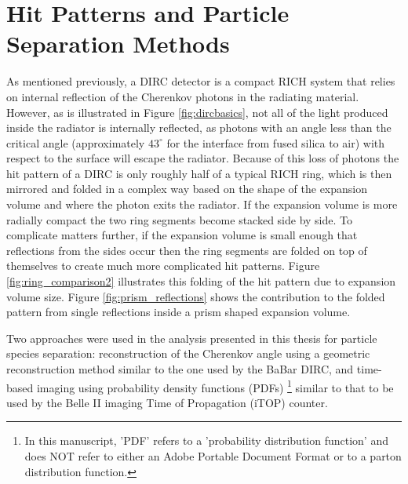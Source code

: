 \section{Hit Patterns and Particle Separation Methods}
As mentioned previously, a DIRC detector is a compact RICH system that relies on internal reflection of the Cherenkov photons in the radiating material. However, as is illustrated in Figure \ref{fig:dircbasics}, not all of the light produced inside the radiator is internally reflected, as photons with an angle less than the critical angle (approximately $43^{\circ}$ for the interface from fused silica to air) with respect to the surface will escape the radiator. Because of this loss of photons the hit pattern of a DIRC is only roughly half of a typical RICH ring, which is then mirrored and folded in a complex way based on the shape of the expansion volume and where the photon exits the radiator. If the expansion volume is more radially compact the two ring segments become stacked side by side. To complicate matters further, if the expansion volume is small enough that reflections from the sides occur then the ring segments are folded on top of themselves to create much more complicated hit patterns. Figure \ref{fig:ring_comparison2} illustrates this folding of the hit pattern due to expansion volume size. Figure \ref{fig:prism_reflections} shows the contribution to the folded pattern from single reflections inside a prism shaped expansion volume.

Two approaches were used in the analysis presented in this thesis for particle species separation: reconstruction of the Cherenkov angle using a geometric reconstruction method similar to the one used by the BaBar DIRC, and time-based imaging using probability density functions (PDFs) \footnote{In this manuscript, 'PDF' refers to a 'probability distribution function' and does NOT refer to either an Adobe\textsuperscript{\textregistered} Portable Document Format or to a parton distribution function.} similar to that to be used by the Belle II imaging Time of Propagation (iTOP) counter.

